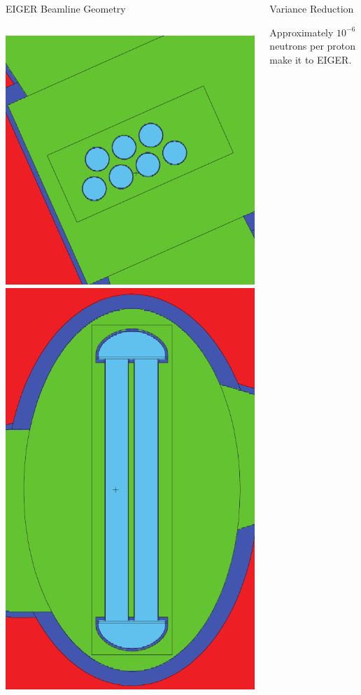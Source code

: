 \documentclass[final,t]{beamer}
\begin{document}
\begin{frame}{}
\begin{columns}[t]
\begin{column}{.3\linewidth}
\begin{block}{EIGER Beamline Geometry}
\begin{columns}[T]
\begin{column}{.25\linewidth}
          \begin{center}
          \includegraphics*[width=.5\linewidth]{wsgeom_xy.pdf} \quad \includegraphics*[width=.31\linewidth]{wsgeom_yz.pdf} 
          \end{center}

        \end{column}
      \end{columns}
      
      \end{block}


      \end{column}



    \begin{column}{.3\linewidth}

      \begin{block}{Variance Reduction}
      \vspace{-2ex}
      \begin{center} Approximately $10^{-6}$ neutrons per proton make it to EIGER. \end{center}


\end{block}
\end{column}
\end{columns}
\end{frame}
\end{document}
